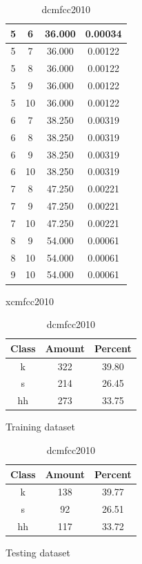 \begin{table}
\begin{subtable}[tbp]{0.45\textwidth}
{\begin{tabular}{|c|c|c|c|}
 5 & 6 & 36.000 & 0.00034\\ \hline 
 5 & 7 & 36.000 & 0.00122\\ \hline 
 5 & 8 & 36.000 & 0.00122\\ \hline 
 5 & 9 & 36.000 & 0.00122\\ \hline 
 5 & 10 & 36.000 & 0.00122\\ \hline 
 6 & 7 & 38.250 & 0.00319\\ \hline 
 6 & 8 & 38.250 & 0.00319\\ \hline 
 6 & 9 & 38.250 & 0.00319\\ \hline 
 6 & 10 & 38.250 & 0.00319\\ \hline 
 7 & 8 & 47.250 & 0.00221\\ \hline 
 7 & 9 & 47.250 & 0.00221\\ \hline 
 7 & 10 & 47.250 & 0.00221\\ \hline 
 8 & 9 & 54.000 & 0.00061\\ \hline 
 8 & 10 & 54.000 & 0.00061\\ \hline 
 9 & 10 & 54.000 & 0.00061\\ \hline 

\end{tabular}
} \label{xlmfcc2010}
\caption{xcmfcc2010}
\end{subtable}

\begin{subtable}[tbp]{0.45\textwidth}
\centering
\begin{tabular}{|c|c|c|}
\hline
Class & Amount & Percent\\ \hline
k & 322 & 39.80\\ \hline
s & 214 & 26.45\\ \hline
hh & 273 & 33.75\\ \hline
\end{tabular}
\caption{Training dataset}
\end{subtable}
\hfill
\begin{subtable}[tbp]{0.45\textwidth}
\centering
\begin{tabular}{|c|c|c|}
\hline
Class & Amount & Percent\\ \hline
k & 138 & 39.77\\ \hline
s & 92 & 26.51\\ \hline
hh & 117 & 33.72\\ \hline
\end{tabular}
\caption{Testing dataset}
\end{subtable}
\hfill

\label{dlmfcc2010}

\caption{dcmfcc2010}

\end{table}\clearpage


